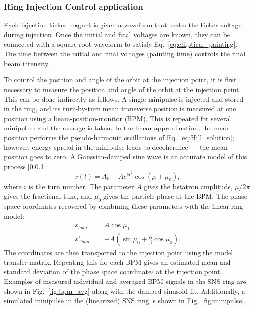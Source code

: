 \subsubsection{Ring Injection Control application}

Each injection kicker magnet is given a waveform that scales the kicker voltage during injection. Once the initial and final voltages are known, they can be connected with a square root waveform to satisfy Eq.~\eqref{eq:elliptical_painting}. The time between the initial and final voltages (painting time) controls the final beam intensity. 

To control the position and angle of the orbit at the injection point, it is first necessary to measure the position and angle of the orbit at the injection point. This can be done indirectly as follows. A single minipulse is injected and stored in the ring, and its turn-by-turn mean transverse position is measured at one position using a beam-position-monitor (BPM). This is repeated for several minipulses and the average is taken. In the linear approximation, the mean position performs the pseudo-harmonic oscillations of Eq.~\eqref{eq:Hill_solution}; however, energy spread in the minipulse leads to decoherence — the mean position goes to zero. A Gaussian-damped sine wave is an accurate model of this process [\ref{}]:
%
\begin{equation}\label{eq:damped_sinusoid}
    x(t) = A_0 + A e^{kt^2} \cos{\left(\mu + \mu_0\right)},
\end{equation}
%
where $t$ is the turn number. The parameter $A$ gives the betatron amplitude, $\mu / 2\pi$ gives the fractional tune, and $\mu_0$ gives the particle phase at the BPM. The phase space coordinates recovered by combining these parameters with the linear ring model:
%
\begin{equation}
\begin{aligned}
    x_{bpm} &= A \cos\mu_0 \\ 
    x'_{bpm} &= -A\left({\sin\mu_0 + \frac{\alpha}{\beta}\cos\mu_0}\right).
\end{aligned}
\end{equation}
%
The coordinates are then transported to the injection point using the model transfer matrix. Repeating this for each BPM gives an estimated mean and standard deviation of the phase space coordinates at the injection point. Examples of measured individual and averaged BPM signals in the SNS ring are shown in Fig.~\ref{fig:bpm_avg} along with the damped-sinusoid fit. Additionally, a simulated minipulse in the (linearized) SNS ring is shown in Fig.~\ref{fig:minipulse}.
